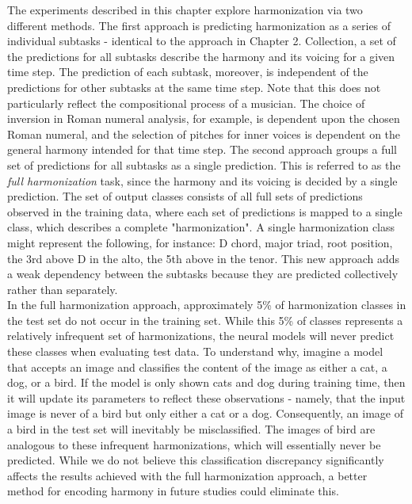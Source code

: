 \documentclass[11pt]{book}
\begin{document}
The experiments described in this chapter explore harmonization via two different methods. The first approach is predicting harmonization as a series of individual subtasks - identical to the approach in Chapter 2. Collection, a set of the predictions for all subtasks describe the harmony and its voicing for a given time step. The prediction of each subtask, moreover, is independent of the predictions for other subtasks at the same time step. Note that this does not particularly reflect the compositional process of a musician. The choice of inversion in Roman numeral analysis, for example, is dependent upon the chosen Roman numeral, and the selection of pitches for inner voices is dependent on the general harmony intended for that time step. The second approach groups a full set of predictions for all subtasks as a single prediction. This is referred to as the \textit{full harmonization} task, since the harmony and its voicing is decided by a single prediction. The set of output classes consists of all full sets of predictions observed in the training data, where each set of predictions is mapped to a single class, which describes a complete "harmonization". A single harmonization class might represent the following, for instance: D chord, major triad, root position, the 3rd above D in the alto, the 5th above in the tenor. This new approach adds a weak dependency between the subtasks because they are predicted collectively rather than separately. \\

In the full harmonization approach, approximately 5\% of harmonization classes in the test set do not occur in the training set. While this 5\% of classes represents a relatively infrequent set of harmonizations, the neural models will never predict these classes when evaluating test data. To understand why, imagine a model that accepts an image and classifies the content of the image as either a cat, a dog, or a bird. If the model is only shown cats and dog during training time, then it will update its parameters to reflect these observations - namely, that the input image is never of a bird but only either a cat or a dog. Consequently, an image of a bird in the test set will inevitably be misclassified. The images of bird are analogous to these infrequent harmonizations, which will essentially never be predicted. While we do not believe this classification discrepancy significantly affects the results achieved with the full harmonization approach, a better method for encoding harmony in future studies could eliminate this. 
\end{document}
